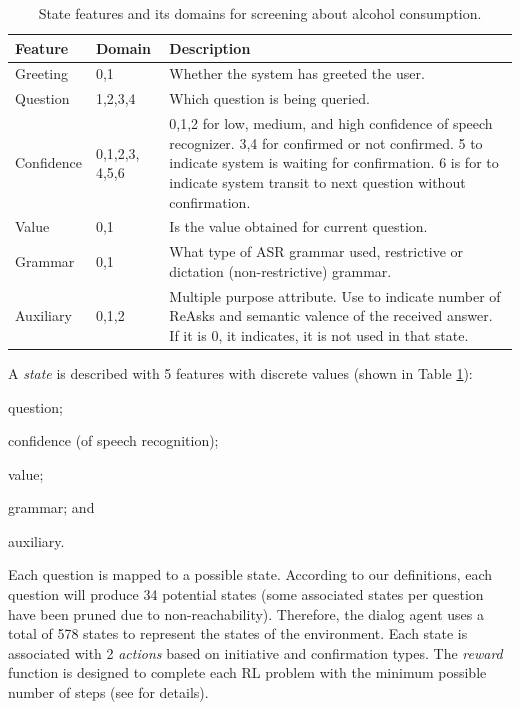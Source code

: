 \documentclass[letterpaper]{article}
\begin{document}
\begin{sloppy}
\begin{table}[!ht]
\caption{State features and its domains for screening about alcohol consumption.}
\label{FeaturesRepresentation}
\begin{tabular}{ | p{14mm} | p{11mm} | p{48mm} | } \hline
    \textbf{Feature} & \textbf{Domain} & \textbf{Description} \\ \hline
    Greeting   & 0,1              & Whether the system has greeted the user. \\ \hline
    Question   & 1,2,3,4          & Which question is being queried.\\ \hline
    Confidence & 0,1,2,3, 4,5,6 & 0,1,2 for low, medium, and high confidence of speech recognizer. 3,4 for
                                  confirmed or not confirmed. 5 to indicate system is waiting for confirmation. 
                                  6 is for to indicate system transit to next question without confirmation.\\ \hline
    Value      & 0,1            & Is the value obtained for current question.\\ \hline
    Grammar    & 0,1            & What type of ASR grammar used, restrictive or dictation (non-restrictive) 
                                  grammar.  \\ \hline
    Auxiliary  & 0,1,2          & Multiple purpose attribute. Use to indicate number of ReAsks and semantic 
                                  valence of the received answer. If it is 0, it indicates, it is not used in 
                                  that state.  \\ \hline
\end{tabular}
\end{table}


A {\em state} is described with 5 features with discrete values (shown in Table 
\ref{FeaturesRepresentation}): \begin{inparaenum}[1)] \item question; 
\item confidence (of speech recognition); \item value; \item grammar; and \item auxiliary. \end{inparaenum} Each 
question is mapped to a possible state. According to our definitions, each question will produce 34 
potential states (some associated states per question have been pruned due to non-reachability). 
Therefore, the dialog agent uses a total of 578 states to represent the states of the environment. Each 
state is associated with 2 {\em actions} based on initiative and  confirmation types. The 
{\em reward} 
function is designed to complete each RL problem with the minimum possible number of steps (see \cite{YASCLL14} for details).  


\end{sloppy}
\end{document}
